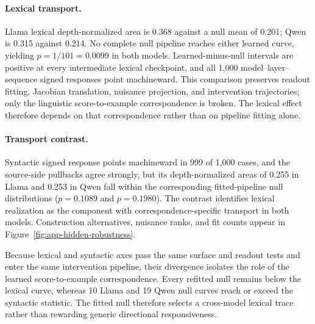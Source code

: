 \paragraph{Lexical transport.} Llama lexical depth-normalized area is 0.368 against a null mean of 0.201; Qwen is 0.315 against 0.214. No complete null pipeline reaches either learned curve, yielding \(p=1/101=0.0099\) in both models. Learned-minus-null intervals are positive at every intermediate lexical checkpoint, and all 1,000 model--layer--sequence signed responses point machineward. This comparison preserves readout fitting, Jacobian translation, nuisance projection, and intervention trajectories; only the linguistic score-to-example correspondence is broken. The lexical effect therefore depends on that correspondence rather than on pipeline fitting alone.

\paragraph{Transport contrast.} Syntactic signed response points machineward in 999 of 1,000 cases, and the source-side pullbacks agree strongly, but its depth-normalized areas of 0.255 in Llama and 0.253 in Qwen fall within the corresponding fitted-pipeline null distributions (\(p=0.1089\) and \(p=0.1980\)). The contrast identifies lexical realization as the component with correspondence-specific transport in both models. Construction alternatives, nuisance ranks, and fit counts appear in Figure~\ref{fig:app-hidden-robustness}.

Because lexical and syntactic axes pass the same surface and readout tests and enter the same intervention pipeline, their divergence isolates the role of the learned score-to-example correspondence. Every refitted null remains below the lexical curve, whereas 10 Llama and 19 Qwen null curves reach or exceed the syntactic statistic. The fitted null therefore selects a cross-model lexical trace rather than rewarding generic directional responsiveness.

